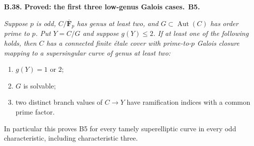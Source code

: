 \documentclass[11pt,a4paper]{article}
\newcommand{\F}{\mathbf F}
\newcommand{\Aut}{\operatorname{Aut}}
\newenvironment{claim}[3]{\par\medskip\noindent\hypertarget{#1}{\textbf{#1. #2.}}\ \textbf{#3.}\par\nopagebreak\smallskip\begingroup\itshape}{\endgroup\par\smallskip}
\begin{document}
\begin{claim}{B.38}{Proved: the first three low-genus Galois cases}{B5}
Suppose $p$ is odd, $C/\overline{\F}_p$ has genus at least two,
and $G\subset\Aut(C)$ has order prime to $p$. Put $Y=C/G$ and
suppose $g(Y)\le2$. If at least one of the following holds, then
$C$ has a connected finite \'etale cover with prime-to-$p$ Galois
closure mapping to a supersingular curve of genus at least two:
\begin{enumerate}
\item $g(Y)=1$ or $2$;
\item $G$ is solvable;
\item two distinct branch values of $C\to Y$ have ramification
indices with a common prime factor.
\end{enumerate}
In particular this proves B5 for every tamely superelliptic curve
in every odd characteristic, including characteristic three.
\end{claim}
\end{document}
